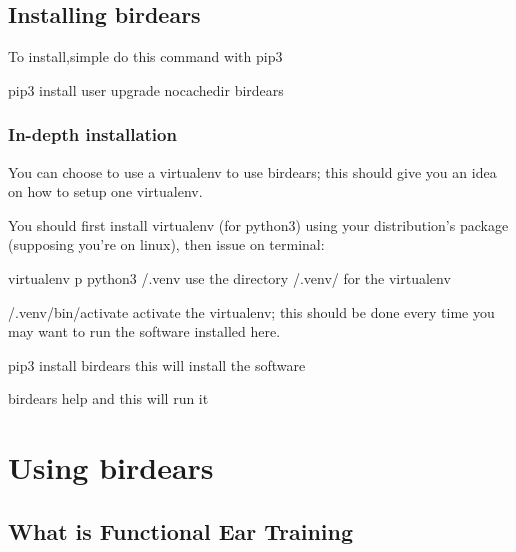 \documentclass[letterpaper,10pt,english]{sphinxmanual}
\begin{document}
\section{Installing birdears}
\label{\detokenize{installing:id1}}
To install,simple do this command with pip3

\begin{sphinxVerbatim}[commandchars=\\\{\}]
pip3 install \PYGZhy{}\PYGZhy{}user \PYGZhy{}\PYGZhy{}upgrade \PYGZhy{}\PYGZhy{}no\PYGZhy{}cache\PYGZhy{}dir birdears
\end{sphinxVerbatim}


\subsection{In-depth installation}
\label{\detokenize{installing:in-depth-installation}}
You can choose to use a virtualenv to use birdears; this should give you
an idea on how to setup one virtualenv.

You should first install virtualenv (for python3) using your
distribution’s package (supposing you’re on linux), then issue on terminal:

\begin{sphinxVerbatim}[commandchars=\\\{\}]
virtualenv \PYGZhy{}p python3 \PYGZti{}/.venv \PYGZsh{} use the directory \PYGZti{}/.venv/ for the virtualenv

\PYGZti{}/.venv/bin/activate          \PYGZsh{} activate the virtualenv; this should be done
                              \PYGZsh{} every time you may want to run the software
                              \PYGZsh{} installed here.

pip3 install birdears         \PYGZsh{} this will install the software

birdears \PYGZhy{}\PYGZhy{}help               \PYGZsh{} and this will run it
\end{sphinxVerbatim}


\chapter{Using birdears}
\label{\detokenize{using::doc}}\label{\detokenize{using:using-birdears}}

\section{What is Functional Ear Training}
\label{\detokenize{using:what-is-functional-ear-training}}
\end{document}
